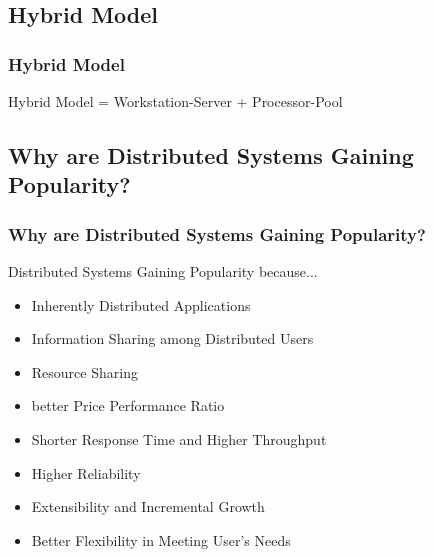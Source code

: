 \documentclass{beamer}
\begin{document}
\subsection{Hybrid Model}
\begin{frame}
    \frametitle{Hybrid Model}
    Hybrid Model = Workstation-Server + Processor-Pool
\end{frame}



\subsection{Why are Distributed Systems Gaining Popularity?}
\begin{frame}
    \frametitle{Why are Distributed Systems Gaining Popularity?}
    Distributed Systems Gaining Popularity because...
    \begin{itemize}
      \item Inherently Distributed Applications
      \item Information Sharing among Distributed Users
      \item Resource Sharing
      \item better Price Performance Ratio
      \item Shorter Response Time and Higher Throughput
      \item Higher Reliability
      \item Extensibility and Incremental Growth
      \item Better Flexibility in Meeting User's Needs
    \end{itemize}
    \vspace{2cm}
\end{frame}
\end{document}
